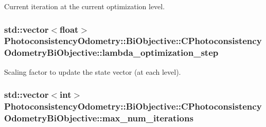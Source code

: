 Current iteration at the current optimization level. \hypertarget{class_photoconsistency_odometry_1_1_bi_objective_1_1_c_photoconsistency_odometry_bi_objective_ab0228ea77ced9d4717870907e435c137}{
\subsubsection[{lambda\_\-optimization\_\-step}]{\setlength{\rightskip}{0pt plus 5cm}std::vector$<$float$>$ {\bf PhotoconsistencyOdometry::BiObjective::CPhotoconsistencyOdometryBiObjective::lambda\_\-optimization\_\-step}}}
\label{class_photoconsistency_odometry_1_1_bi_objective_1_1_c_photoconsistency_odometry_bi_objective_ab0228ea77ced9d4717870907e435c137}
Scaling factor to update the state vector (at each level). \hypertarget{class_photoconsistency_odometry_1_1_bi_objective_1_1_c_photoconsistency_odometry_bi_objective_a92cf677b2555e928f70401e87285841f}{
\subsubsection[{max\_\-num\_\-iterations}]{\setlength{\rightskip}{0pt plus 5cm}std::vector$<$int$>$ {\bf PhotoconsistencyOdometry::BiObjective::CPhotoconsistencyOdometryBiObjective::max\_\-num\_\-iterations}}}
\label{class_photoconsistency_odometry_1_1_bi_objective_1_1_c_photoconsistency_odometry_bi_objective_a92cf677b2555e928f70401e87285841f}
